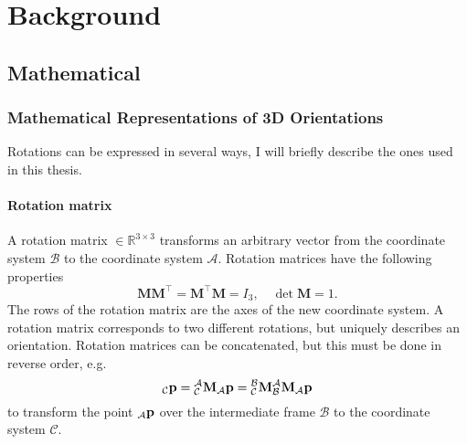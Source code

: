 \chapter{Background}
\label{ch:Background}

\section{Mathematical}
\subsection{Mathematical Representations of 3D Orientations}
Rotations can be expressed in several ways, I will briefly describe the ones used in this thesis.

\subsubsection{Rotation matrix}
A rotation matrix  $\in \mathbb{R}^{3\times3}$ transforms an arbitrary vector from the coordinate system $\mathcal{B}$ to the coordinate system $\mathcal{A}$.
Rotation matrices have the following properties
\begin{equation}
	\mathbf{M}\mathbf{M}^\intercal = \mathbf{M}^\intercal \mathbf{M} = I_3, \quad \det \mathbf{M} = 1.
\end{equation}
The rows of the rotation matrix are the axes of the new coordinate system.
A rotation matrix corresponds to two different rotations, but uniquely describes an orientation.
Rotation matrices can be concatenated, but this must be done in reverse order, e.g.
\begin{equation}
	{}_\mathcal{C}\vb{p} = \mtf{a}{c}{}_\mathcal{A}\vb{p} = \mtf{b}{c}\mtf{a}{b}{}_\mathcal{A}\vb{p}
\end{equation}
to transform the point ${}_\mathcal{A}\vb{p}$ over the intermediate frame $\mathcal{B}$ to the coordinate system $\mathcal{C}$.

